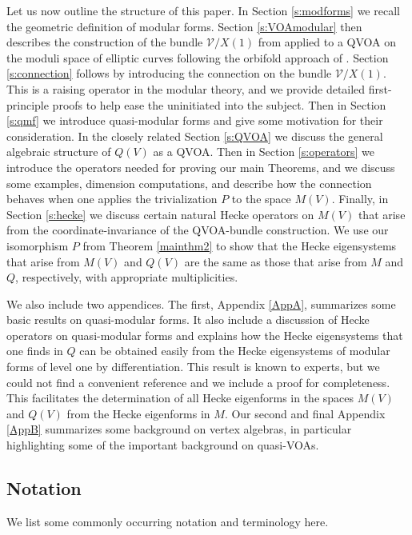 \documentclass[12pt]{amsart}
\theoremstyle{plain}
\theoremstyle{definition}
\theoremstyle{remark}
\newcommand{\cV}{\mathcal{V}}
\begin{document}
Let us now outline the structure of this paper. In Section \ref{s:modforms} we recall the geometric definition of modular forms. Section \ref{s:VOAmodular} then describes the construction of the bundle $\cV/X(1)$ from \cite{FBZ} applied to a QVOA on the moduli space of elliptic curves following the orbifold approach of \cite{Hain}. Section \ref{s:connection} follows by introducing the connection on the bundle $\cV/X(1)$. This is a raising operator in the modular theory, and we provide detailed first-principle proofs to help ease the uninitiated into the subject. Then in Section \ref{s:qmf} we introduce quasi-modular forms and give some motivation for their consideration. In the closely related Section \ref{s:QVOA} we discuss the general algebraic structure of $Q(V)$ as a QVOA. Then in Section \ref{s:operators} we introduce the operators needed for proving our main Theorems, and we discuss some examples, dimension computations, and describe how the connection behaves when one applies the trivialization $P$ to the space $M(V)$. Finally, in Section \ref{s:hecke} we discuss certain natural Hecke operators on $M(V)$ that arise from the coordinate-invariance of the QVOA-bundle construction. We use our isomorphism $P$ from Theorem \ref{mainthm2} to show that the Hecke eigensystems that arise from $M(V)$ and $Q(V)$ are the same as those that arise from $M$ and $Q$, respectively, with appropriate multiplicities. 

We also include two appendices. The first, Appendix \ref{AppA}, summarizes some basic results on quasi-modular forms. It also include a discussion of Hecke operators on quasi-modular forms and explains how the Hecke eigensystems that one finds in $Q$ can be obtained easily from the Hecke eigensystems of modular forms of level one by differentiation. This result is known to experts, but we could not find a convenient reference and we include a proof for completeness. This facilitates the  determination of all Hecke eigenforms in the spaces $M(V)$ and $Q(V)$ from the Hecke eigenforms in $M$. Our second and final Appendix \ref{AppB} summarizes some background on vertex algebras, in particular highlighting some of the important background on quasi-VOAs.

\subsection{Notation}\label{SNotation} We list some commonly occurring notation and terminology here.
\end{document}
